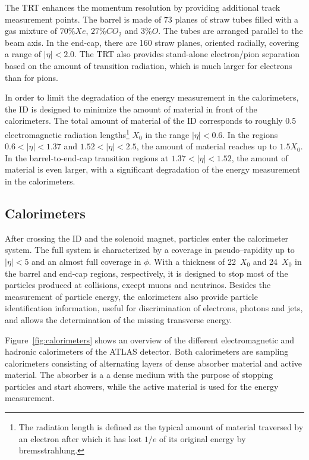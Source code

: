 The TRT enhances the momentum resolution by providing additional track
measurement points.
The barrel is made of 73 planes of straw tubes filled with a gas
mixture of $70\% Xe$, $27\% CO_2$ and $3\% O$. The tubes
are arranged parallel to the beam axis.
In the end-cap, there are 160 straw planes, oriented radially,
covering a range of \mbox{$|\eta| < 2.0$}. 
The TRT also provides stand-alone electron/pion separation based on
the amount of transition radiation, which is much larger for electrons
than for pions.

In order to limit the degradation of the energy measurement in the
calorimeters, the ID is designed to minimize the amount of material in
front of the calorimeters.
The total amount of material of the ID corresponds to roughly 0.5
electromagnetic radiation lengths\footnote{The radiation length is
  defined as the typical amount of material traversed by an electron
  after which it has lost $1/e$ of its original energy by
  bremsstrahlung.} $X_0$ in the range \mbox{$|\eta| < 0.6$}.
In the regions \mbox{$0.6 < |\eta| < 1.37$} and \mbox{$1.52 < |\eta| <
  2.5$}, the amount of material reaches up to \mbox{$1.5 X_0$}.
In the barrel-to-end-cap transition regions at \mbox{$1.37 < |\eta| <
  1.52$}, the amount of material is even larger, with a significant
degradation of the energy measurement in the calorimeters.

\subsection{Calorimeters}
\label{sec:calorimeter}

After crossing the ID and the solenoid magnet, particles enter the
calorimeter system.
The full system is characterized by a coverage in pseudo--rapidity up to
$|\eta|<5$ and an almost full coverage in $\phi$. With  a thickness of
22~$X_0$ and 24~$X_0$ in the barrel and end-cap regions, respectively, 
it is designed to stop most of the particles produced at collisions,
except muons and neutrinos.
Besides the measurement of particle energy, the calorimeters also
provide particle identification information, useful for discrimination
of electrons, photons and jets, and allows the determination
of the missing transverse energy.

Figure~\ref{fig:calorimeters} shows an overview of the different
electromagnetic  and hadronic calorimeters of the ATLAS detector.
Both calorimeters are sampling calorimeters consisting of alternating
layers of dense absorber material and active material.
The absorber is a a dense medium with the purpose of stopping
particles and start showers, while the active material is used for the
energy measurement.

